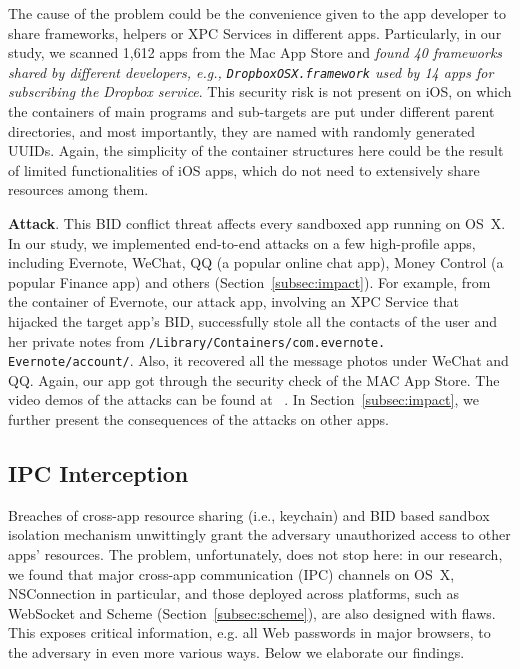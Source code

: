 \documentclass{article}
\newcommand{\ignore}[1]{}
\begin{document}
The cause of the problem could be the convenience given to the app developer to share frameworks, helpers or XPC Services in different apps. Particularly, in our study, we scanned 1,612 apps from the Mac App Store and \textit{found 40 frameworks shared by different developers, e.g., \texttt{DropboxOSX.framework} used by 14 apps for subscribing the Dropbox service}. This security risk is not present on iOS, on which the containers of main programs and sub-targets are put under different parent directories, and most importantly, they are named with randomly generated UUIDs. Again, the simplicity of the container structures here could be the result of limited functionalities of iOS apps, which do not need to extensively share resources among them.



\vspace {3pt}\noindent\textbf{Attack}. This BID conflict threat affects every sandboxed app running on OS~X. In our study,  we implemented end-to-end attacks on a few high-profile apps, including Evernote, WeChat, QQ (a popular online chat app), Money Control (a popular Finance app) and others (Section~\ref{subsec:impact}). For example, from the container of Evernote, our attack app, involving an XPC Service that hijacked the target app's BID, successfully stole all the contacts of the user and her private notes from \texttt{/Library/Containers/com.evernote.\\Evernote/account/}.  Also, it recovered all the message photos under WeChat and QQ. Again, our app got through the security check of the MAC App Store. The video demos of the attacks can be found at ~\cite{supporting}. In Section~\ref{subsec:impact}, we further present the consequences of the attacks on other apps.








\subsection{IPC Interception}
\label{subsec:IPC}




Breaches of cross-app resource sharing (i.e., keychain) and BID based sandbox isolation mechanism unwittingly grant the adversary unauthorized access to other apps' resources. The problem, unfortunately, does not stop here: in our research, we found that major cross-app communication (IPC) channels on OS~X, NSConnection in particular, and those deployed across platforms, such as WebSocket and Scheme (Section~\ref{subsec:scheme}), are also designed with flaws. This exposes critical information, e.g. all Web passwords in major browsers, to the adversary in even more various ways.  Below we elaborate our findings\ignore{ about NSConnection, XPC and WebSocket, and leave URL scheme, a more popular channel for both OS~X and iOS}.
\end{document}
